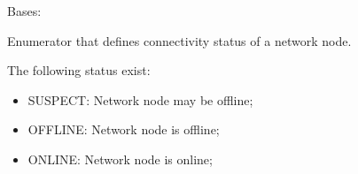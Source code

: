 \documentclass[letterpaper,10pt,english]{sphinxmanual}
\begin{document}

\begin{fulllineitems}
\label{\detokenize{app.domain.helpers:app.domain.helpers.enums.Status}}
Bases: 

Enumerator that defines connectivity status of a network node.

The following status exist:
\begin{itemize}
\item {} 
SUSPECT: Network node may be offline;

\item {} 
OFFLINE: Network node is offline;

\item {} 
ONLINE: Network node is online;

\end{itemize}

\begin{fulllineitems}
\label{\detokenize{app.domain.helpers:app.domain.helpers.enums.Status.OFFLINE}}
\end{fulllineitems}


\begin{fulllineitems}
\label{\detokenize{app.domain.helpers:app.domain.helpers.enums.Status.ONLINE}}
\end{fulllineitems}


\begin{fulllineitems}
\label{\detokenize{app.domain.helpers:app.domain.helpers.enums.Status.SUSPECT}}
\end{fulllineitems}


\end{fulllineitems}
\end{document}
